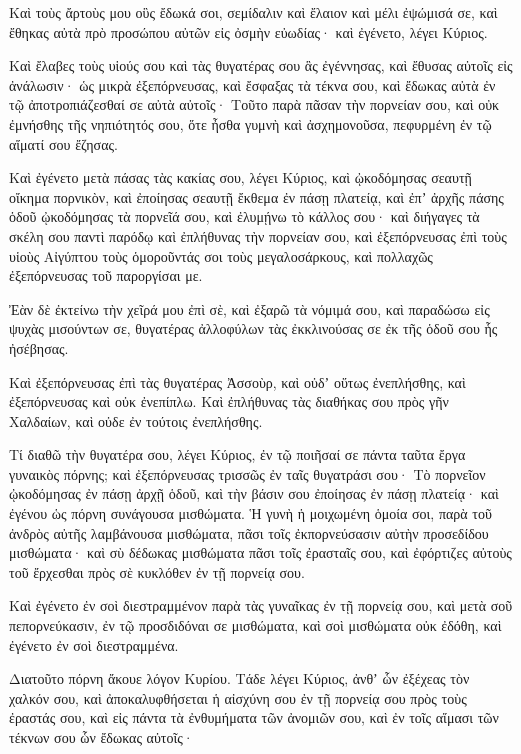 {Καὶ τοὺς ἄρτοὺς μου οὓς ἔδωκά σοι, σεμίδαλιν καὶ ἔλαιον καὶ μέλι ἐψώμισά σε, καὶ ἔθηκας αὐτὰ πρὸ προσώπου αὐτῶν εἰς ὀσμὴν εὐωδίας· καὶ ἐγένετο, λέγει Κύριος.
\par }{\PP {}Καὶ ἔλαβες τοὺς υἱούς σου καὶ τὰς θυγατέρας σου ἃς ἐγέννησας, καὶ ἔθυσας αὐτοῖς εἰς ἀνάλωσιν· ὡς μικρὰ ἐξεπόρνευσας,
καὶ ἔσφαξας τὰ τέκνα σου, καὶ ἔδωκας αὐτὰ ἐν τῷ ἀποτροπιάζεσθαί σε αὐτὰ αὐτοῖς·
Τοῦτο παρὰ πᾶσαν τὴν πορνείαν σου, καὶ οὐκ ἐμνήσθης τῆς νηπιότητός σου, ὅτε ἦσθα γυμνὴ καὶ ἀσχημονοῦσα, πεφυρμένη ἐν τῷ αἵματί σου ἔζησας.
\par }{\PP {}Καὶ ἐγένετο μετὰ πάσας τὰς κακίας σου, λέγει Κύριος,
καὶ ᾠκοδόμησας σεαυτῇ οἴκημα πορνικὸν, καὶ ἐποίησας σεαυτῇ ἔκθεμα ἐν πάσῃ πλατείᾳ,
καὶ ἐπʼ ἀρχῆς πάσης ὁδοῦ ᾠκοδόμησας τὰ πορνεῖά σου, καὶ ἐλυμῄνω τὸ κάλλος σου· καὶ διήγαγες τὰ σκέλη σου παντὶ παρόδῳ καὶ ἐπλήθυνας τὴν πορνείαν σου,
καὶ ἐξεπόρνευσας ἐπὶ τοὺς υἱοὺς Αἰγύπτου τοὺς ὁμοροῦντάς σοι τοὺς μεγαλοσάρκους, καὶ πολλαχῶς ἐξεπόρνευσας τοῦ παροργίσαι με.
\par }{\PP {}Ἐὰν δὲ ἐκτείνω τὴν χεῖρά μου ἐπὶ σὲ, καὶ ἐξαρῶ τὰ νόμιμά σου, καὶ παραδώσω εἰς ψυχὰς μισούντων σε, θυγατέρας ἀλλοφύλων τὰς ἐκκλινούσας σε ἐκ τῆς ὁδοῦ σου ἧς ἠσέβησας.
\par }{\PP {}Καὶ ἐξεπόρνευσας ἐπὶ τὰς θυγατέρας Ἀσσοὺρ, καὶ οὐδʼ οὕτως ἐνεπλήσθης, καὶ ἐξεπόρνευσας καὶ οὐκ ἐνεπίπλω.
Καὶ ἐπλήθυνας τὰς διαθήκας σου πρὸς γῆν Χαλδαίων, καὶ οὐδε ἐν τούτοις ἐνεπλήσθης.
\par }{\PP {}Τί διαθῶ τὴν θυγατέρα σου, λέγει Κύριος, ἐν τῷ ποιῆσαί σε πάντα ταῦτα ἔργα γυναικὸς πόρνης; καὶ ἐξεπόρνευσας τρισσῶς ἐν ταῖς θυγατράσι σου·
Τὸ πορνεῖον ᾠκοδόμησας ἐν πάσῃ ἀρχῇ ὁδοῦ, καὶ τὴν βάσιν σου ἐποίησας ἐν πάσῃ πλατείᾳ· καὶ ἐγένου ὡς πόρνη συνάγουσα μισθώματα.
Ἡ γυνὴ ἡ μοιχωμένη ὁμοία σοι, παρὰ τοῦ ἀνδρὸς αὐτῆς λαμβάνουσα μισθώματα, πᾶσι τοῖς ἐκπορνεύσασιν αὐτὴν προσεδίδου μισθώματα·
καὶ σὺ δέδωκας μισθώματα πᾶσι τοῖς ἐρασταῖς σου, καὶ ἐφόρτιζες αὐτοὺς τοῦ ἔρχεσθαι πρὸς σὲ κυκλόθεν ἐν τῇ πορνείᾳ σου.
\par }{\PP {}Καὶ ἐγένετο ἐν σοὶ διεστραμμένον παρὰ τὰς γυναῖκας ἐν τῇ πορνείᾳ σου, καὶ μετὰ σοῦ πεπορνεύκασιν, ἐν τῷ προσδιδόναι σε μισθώματα, καὶ σοὶ μισθώματα οὐκ ἐδόθη, καὶ ἐγένετο ἐν σοὶ διεστραμμένα.
\par }{\PP {}Διατοῦτο πόρνη ἄκουε λόγον Κυρίου.
Τάδε λέγει Κύριος, ἀνθʼ ὧν ἐξέχεας τὸν χαλκόν σου, καὶ ἀποκαλυφθήσεται ἡ αἰσχύνη σου ἐν τῇ πορνείᾳ σου πρὸς τοὺς ἐραστάς σου, καὶ εἰς πάντα τὰ ἐνθυμήματα τῶν ἀνομιῶν σου, καὶ ἐν τοῖς αἵμασι τῶν τέκνων σου ὧν ἔδωκας αὐτοῖς·
}
